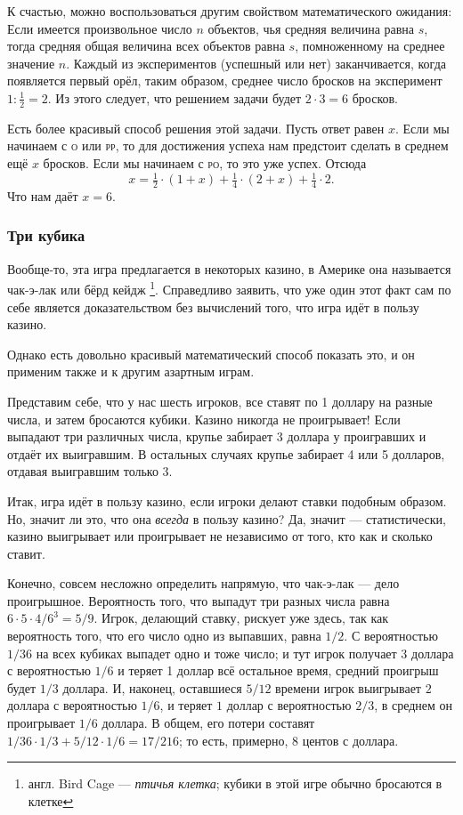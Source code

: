 К счастью, можно воспользоваться другим свойством математического ожидания:
Если имеется произвольное число $n$ объектов, чья средняя величина равна $s$, тогда средняя общая величина всех объектов равна $s$, помноженному на среднее значение $n$.
Каждый из экспериментов (успешный или нет) заканчивается, когда появляется первый орёл, таким образом, среднее число бросков на эксперимент $1:\tfrac12=2$.
Из этого следует, что
решением задачи будет $2{\cdot}3=6$ бросков.\heart

Есть более красивый способ решения этой задачи.
Пусть ответ равен $x$.
Если мы начинаем с \textsc{о} или \textsc{рр}, то для достижения успеха нам предстоит сделать в среднем ещё $x$ бросков.
Если мы начинаем с \textsc{ро}, то это уже успех.
Отсюда
\[x=\tfrac12 \cdot(1+x)+\tfrac14 \cdot(2+x)+\tfrac14 \cdot2.\]
Что нам даёт $x=6$.

\subsubsection*{Три кубика}%

Вообще-то, эта игра предлагается в некоторых казино, в Америке она называется чак-э-лак или бёрд кейдж%
\footnote{англ. Bird Cage --- \emph{птичья клетка}; кубики в этой игре обычно бросаются в клетке}. %
Справедливо заявить, что уже один этот факт сам по себе является доказательством без вычислений того, что игра идёт в пользу казино.

Однако есть довольно красивый математический способ показать это, и он применим также и к другим азартным играм.

\medskip

Представим себе, что у нас шесть игроков, все ставят по 1 доллару на разные числа, и затем бросаются кубики.
Казино никогда не проигрывает!
Если выпадают три различных числа, крупье забирает 3 доллара у проигравших и отдаёт их выигравшим.
В остальных случаях крупье забирает 4 или 5 долларов, отдавая выигравшим только 3.
\heart

Итак, игра идёт в пользу казино, если игроки делают ставки подобным образом.
Но, значит ли это, что она \emph{всегда} в пользу казино?
Да, значит --- статистически, казино выигрывает или проигрывает не независимо от того, кто как и сколько ставит.

Конечно, совсем несложно определить напрямую, что чак-э-лак --- дело проигрышное.
Вероятность того, что выпадут три разных числа равна $6{\cdot}5{\cdot}4/6^3=5/9$.
Игрок, делающий ставку, рискует уже здесь, так как вероятность того, что его число одно из выпавших, равна $1/2$.
С вероятностью $1/36$ на всех кубиках выпадет одно и тоже число;
и тут игрок получает $3$ доллара с вероятностью $1/6$ и теряет 1 доллар всё остальное время, средний проигрыш будет $1/3$ доллара.
И, наконец, оставшиеся $5/12$ времени игрок выигрывает $2$ доллара с вероятностью $1/6$, и теряет $1$ доллар с вероятностью $2/3$, в среднем он проигрывает $1/6$ доллара.
В общем, его потери составят $1/36{\cdot}1/3 + 5/12{\cdot}1/6 = 17/216$; то есть, примерно, $8$ центов с доллара.

